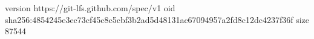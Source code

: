 version https://git-lfs.github.com/spec/v1
oid sha256:4854245e3ec73cf45c8c5cbf3b2ad5d48131ac67094957a2fd8c12dc4237f36f
size 87544
